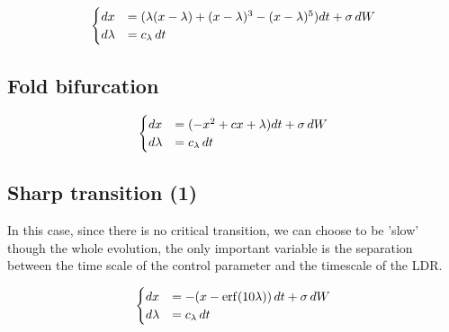 \begin{equation}
	\begin{cases}
		dx&=(\lambda (x-\lambda)+(x-\lambda)^3-(x-\lambda)^5)dt +\sigma \, dW\\
		d\lambda&=c_\lambda \, dt
	\end{cases}
	\label{eq:ASSslanted}
\end{equation}


\subsection{Fold bifurcation}


\begin{equation}
	\begin{cases}
		dx&=(-x^2+cx+\lambda) dt +\sigma  \, dW\\
		d\lambda&=c_\lambda \, dt
	\end{cases}
	\label{eq:ASSfold}
\end{equation}

\subsection{Sharp transition (1) }

In this case, since there is no critical transition, we can choose to be 'slow' though the whole evolution, the only important variable is the separation between the time scale of the control parameter and the timescale of the LDR.
 
\begin{equation}
	\begin{cases}
	dx&=-(x-\mathrm{erf}(10\lambda)) \, dt +\sigma \, dW\\
	d\lambda&=c_\lambda \, dt
\end{cases}
\end{equation}



